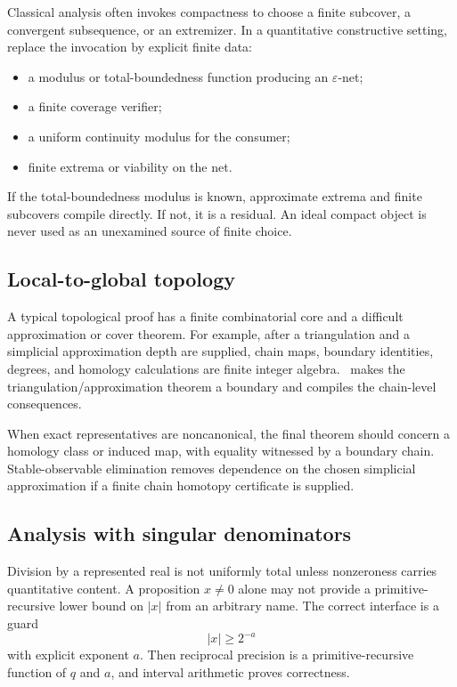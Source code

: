 Classical analysis often invokes compactness to choose a finite subcover, a convergent subsequence, or an extremizer.  In a quantitative constructive setting, replace the invocation by explicit finite data:

\begin{itemize}
\item a modulus or total-boundedness function producing an \(\varepsilon\)-net;
\item a finite coverage verifier;
\item a uniform continuity modulus for the consumer;
\item finite extrema or viability on the net.
\end{itemize}

If the total-boundedness modulus is known, approximate extrema and finite subcovers compile directly.  If not, it is a residual.  An ideal compact object is never used as an unexamined source of finite choice.

\subsection{Local-to-global topology}

A typical topological proof has a finite combinatorial core and a difficult approximation or cover theorem.  For example, after a triangulation and a simplicial approximation depth are supplied, chain maps, boundary identities, degrees, and homology calculations are finite integer algebra.  \CIFER\ makes the triangulation/approximation theorem a boundary and compiles the chain-level consequences.

When exact representatives are noncanonical, the final theorem should concern a homology class or induced map, with equality witnessed by a boundary chain.  Stable-observable elimination removes dependence on the chosen simplicial approximation if a finite chain homotopy certificate is supplied.

\subsection{Analysis with singular denominators}

Division by a represented real is not uniformly total unless nonzeroness carries quantitative content.  A proposition \(x\ne0\) alone may not provide a primitive-recursive lower bound on \(|x|\) from an arbitrary name.  The correct interface is a guard
\[
 |x|\ge 2^{-a}
\]
with explicit exponent \(a\).  Then reciprocal precision is a primitive-recursive function of \(q\) and \(a\), and interval arithmetic proves correctness.

